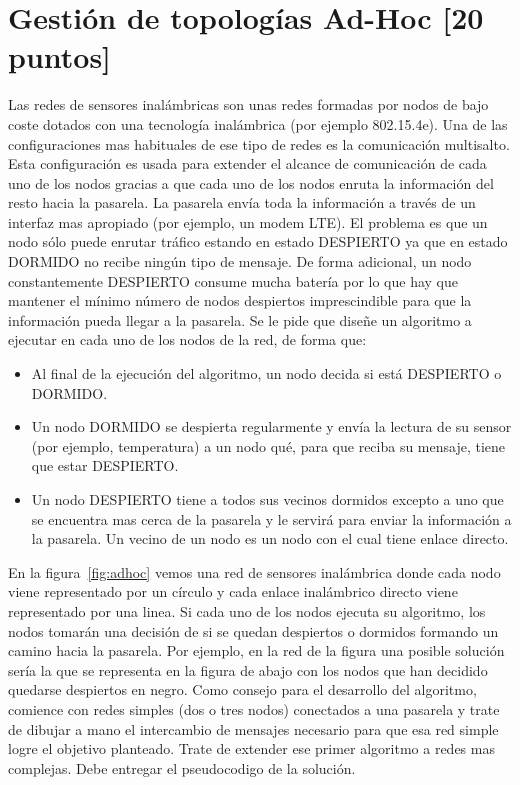 \section{Gestión de topologías Ad-Hoc [20 puntos]}
Las redes de sensores inalámbricas son unas redes formadas por nodos de bajo coste dotados con una tecnología inalámbrica (por ejemplo 802.15.4e). Una de las configuraciones mas habituales de ese tipo de redes es la comunicación multisalto. Esta configuración es usada para extender el alcance de comunicación de cada uno de los nodos gracias a que cada uno de los nodos enruta la información del resto hacia la pasarela. La pasarela envía toda la información a través de un interfaz mas apropiado (por ejemplo, un modem LTE). El problema es que un nodo sólo puede enrutar tráfico estando en estado DESPIERTO ya que en estado DORMIDO no recibe ningún tipo de mensaje. De forma adicional, un nodo constantemente DESPIERTO consume mucha batería por lo que hay que mantener el mínimo número de nodos despiertos imprescindible para que la información pueda llegar a la pasarela. Se le pide que diseñe un algoritmo a ejecutar en cada uno de los nodos de la red, de forma que:
\begin{itemize}
\item Al final de la ejecución del algoritmo, un nodo decida si está DESPIERTO o DORMIDO.
\item Un nodo DORMIDO se despierta regularmente y envía la lectura de su sensor (por ejemplo, temperatura) a un nodo qué, para que reciba su mensaje, tiene que estar  DESPIERTO.
\item Un nodo DESPIERTO tiene a todos sus vecinos dormidos excepto a uno que se encuentra mas cerca de la pasarela y le servirá para enviar la información a la pasarela.  Un vecino de un nodo es un nodo con el cual tiene enlace directo. 
\end{itemize}
En la figura~\ref{fig:adhoc} vemos una red de sensores inalámbrica donde cada nodo viene representado por un círculo y cada enlace inalámbrico directo viene representado por una linea. Si cada uno de los nodos  ejecuta su algoritmo, los nodos tomarán una decisión de si se quedan despiertos o dormidos formando un camino hacia la pasarela. Por ejemplo, en la red de la figura una posible solución sería la que se representa en la figura de abajo con los nodos que han decidido quedarse despiertos en negro.
Como consejo para el desarrollo del algoritmo, comience con redes simples (dos o tres nodos) conectados a una pasarela y trate de dibujar a mano el intercambio de mensajes necesario para que esa red simple logre el objetivo planteado. Trate de extender ese primer algoritmo a redes mas complejas.
Debe entregar el pseudocodigo de la solución.

